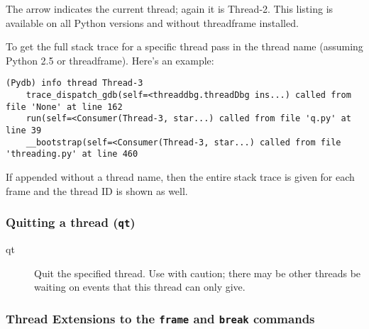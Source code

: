 \begin{description}
The arrow indicates the current thread; again it is Thread-2. This
listing is available on all Python versions and without threadframe
installed.

To get the full stack trace for a specific thread pass in the thread
name (assuming Python 2.5 or threadframe). Here's an example:

\begin{verbatim}
(Pydb) info thread Thread-3
    trace_dispatch_gdb(self=<threaddbg.threadDbg ins...) called from file 'None' at line 162
    run(self=<Consumer(Thread-3, star...) called from file 'q.py' at line 39
    __bootstrap(self=<Consumer(Thread-3, star...) called from file 'threading.py' at line 460
\end{verbatim}

If  appended without a thread name, then the entire
stack trace is given for each frame and the thread ID is shown as well.

\end{description}

%
%

\subsubsection{Quitting a thread ({\tt qt})\label{command:qt}}
\begin{description}
\item[qt ] 

Quit the specified thread. Use with caution; there may be other
threads be waiting on events that this thread can only give.
\end{description}

\subsubsection{Thread Extensions to the {\tt frame} and {\tt break} commands}\label{command:thread-extensions}

